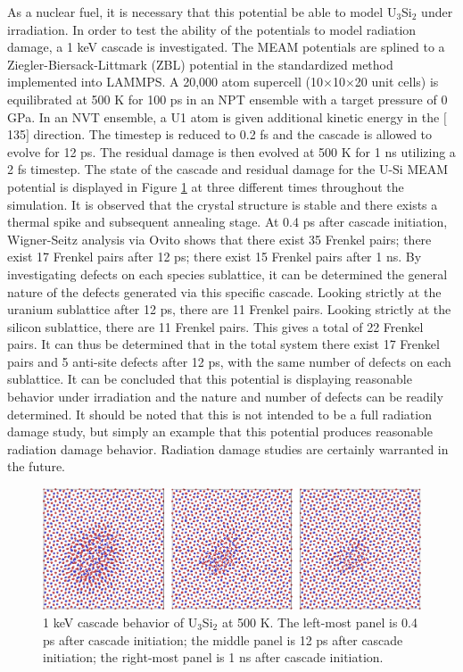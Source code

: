 \documentclass[review]{elsarticle}
\begin{document}
As a nuclear fuel, it is necessary that this potential be able to model U$_{3}$Si$_{2}$ under irradiation.  In order to test the ability of the potentials to model radiation damage, a 1 keV cascade is investigated.   The MEAM potentials are splined to a Ziegler-Biersack-Littmark (ZBL) \cite{zbl} potential in the standardized method implemented into LAMMPS.  A 20,000 atom supercell (10$\times$10$\times$20 unit cells) is equilibrated at 500 K for 100 ps in an NPT ensemble with a target pressure of 0 GPa.  In an NVT ensemble, a U1 atom is given additional kinetic energy in the $[$135$]$ direction.  The timestep is reduced to 0.2 fs and the cascade is allowed to evolve for 12 ps.  The residual damage is then evolved at 500 K for 1 ns utilizing a 2 fs timestep.  The state of the cascade and residual damage for the U-Si MEAM potential is displayed in Figure \ref{fig:ben6} at three different times throughout the simulation.  It is observed that the crystal structure is stable and there exists a thermal spike and subsequent annealing stage.  At 0.4 ps after cascade initiation, Wigner-Seitz analysis via Ovito \cite{ovito} shows that there exist 35 Frenkel pairs; there exist 17 Frenkel pairs after 12 ps; there exist 15 Frenkel pairs after 1 ns.  By investigating defects on each species sublattice, it can be determined the general nature of the defects generated via this specific cascade.  Looking strictly at the uranium sublattice after 12 ps, there are 11 Frenkel pairs.  Looking strictly at the silicon sublattice, there are 11 Frenkel pairs.  This gives a total of 22 Frenkel pairs.  It can thus be determined that in the total system there exist 17 Frenkel pairs and 5 anti-site defects after 12 ps, with the same number of defects on each sublattice.  It can be concluded that this potential is displaying reasonable behavior under irradiation and the nature and number of defects can be readily determined.  It should be noted that this is not intended to be a full radiation damage study, but simply an example that this potential produces reasonable radiation damage behavior.  Radiation damage studies are certainly warranted in the future.  

 \begin{figure}[bt]
	\centering
	\includegraphics[width=\textwidth]{cascade_total.png}
    \caption{1 keV cascade behavior of U$_{3}$Si$_{2}$ at 500 K.  The left-most panel is 0.4 ps after cascade initiation; the middle panel is 12 ps after cascade initiation; the right-most panel is 1 ns after cascade initiation.}\label{fig:ben6}
\end{figure}
\end{document}
